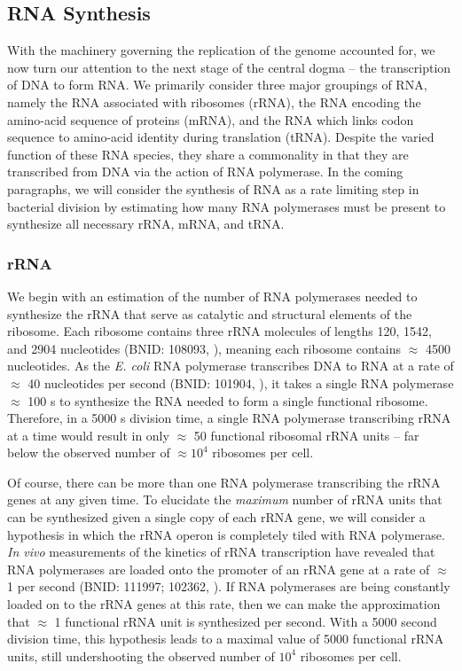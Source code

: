 \subsection{RNA Synthesis}
With the machinery governing the replication of the genome accounted for, we
now turn our attention to the next stage of the central dogma -- the
transcription of DNA to form RNA. We primarily consider three major groupings
of RNA, namely the RNA associated with ribosomes (rRNA), the RNA encoding the
amino-acid sequence of proteins (mRNA), and the RNA which links codon
sequence to amino-acid identity during translation (tRNA). Despite the varied
function of these RNA species, they share a commonality in that they are
transcribed from DNA via the action of RNA polymerase. In the coming
paragraphs, we will consider the synthesis of RNA as a rate limiting step in
bacterial division by estimating how many RNA polymerases must be present to
synthesize all necessary rRNA, mRNA, and tRNA.

\subsubsection{rRNA}
We begin with an estimation of the number of RNA polymerases needed to
synthesize the rRNA that serve as catalytic and structural elements of the
ribosome. Each ribosome contains three rRNA molecules of lengths 120, 1542,
and 2904 nucleotides (BNID: 108093, \cite{milo2010}), meaning each ribosome
contains $\approx$ 4500 nucleotides. As the \textit{E. coli} RNA polymerase
transcribes DNA to RNA at a rate of $\approx$ 40 nucleotides per second
(BNID: 101904, \cite{milo2010}), it takes a single RNA polymerase
$\approx$ 100 s to synthesize the RNA needed to form a single functional ribosome.
Therefore, in a 5000 s division time, a single RNA polymerase transcribing
rRNA at a time would result in only $\approx$ 50 functional ribosomal rRNA
units -- far below the observed number of $\approx 10^4$ ribosomes per cell.

Of course, there can be more than one RNA polymerase transcribing the rRNA genes
at any given time. To elucidate the \textit{maximum} number of rRNA units that can
be synthesized given a single copy of each rRNA gene, we will consider a
hypothesis in which the rRNA operon is completely tiled with RNA polymerase.
\textit{In vivo} measurements of the kinetics of rRNA transcription have revealed that
RNA polymerases are loaded onto the promoter of an rRNA gene at a rate of
$\approx$ 1 per second (BNID: 111997; 102362, \cite{milo2010}). If RNA
polymerases are being constantly loaded on to the rRNA genes at this rate,
then we can make the approximation that $\approx$ 1 functional rRNA unit is
synthesized per second. With a 5000 second division time, this hypothesis
leads to a maximal value of 5000 functional rRNA units, still undershooting
the observed number of $10^4$ ribosomes per cell.

